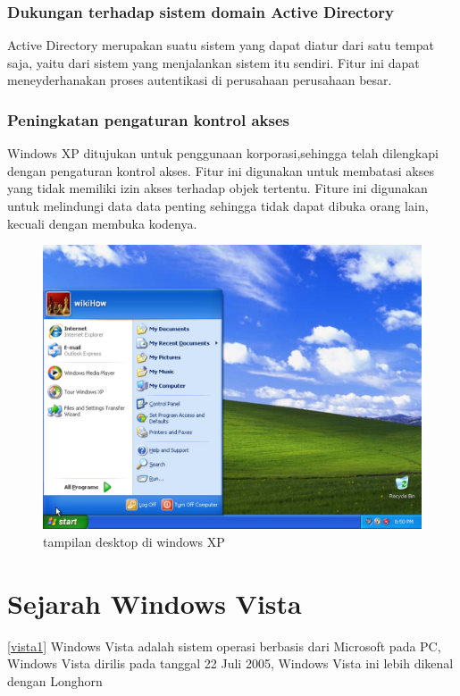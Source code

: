			\subsubsection{Dukungan terhadap sistem domain Active Directory} 
				Active Directory merupakan suatu sistem yang dapat diatur dari satu tempat saja, yaitu dari sistem yang menjalankan sistem itu sendiri. Fitur ini dapat meneyderhanakan 	proses autentikasi di perusahaan perusahaan besar.
			\subsubsection{Peningkatan pengaturan kontrol akses}
				Windows XP ditujukan untuk penggunaan korporasi,sehingga telah dilengkapi dengan pengaturan kontrol akses. Fitur ini digunakan untuk membatasi akses yang tidak memiliki izin akses terhadap objek tertentu.
				Fiture ini digunakan untuk melindungi data data penting sehingga tidak dapat dibuka orang lain, kecuali dengan membuka kodenya.

\begin{figure}[ht]
\centerline{\includegraphics[width=1\textwidth]{figures/windowsxp.JPG}}
\caption{tampilan desktop di windows XP}
\label{windowsxp}
\end{figure}
	\section{Sejarah Windows Vista}
\ref{vista1}
		Windows Vista adalah sistem operasi berbasis dari Microsoft pada PC, Windows Vista dirilis pada tanggal 22 Juli 2005, Windows Vista ini lebih dikenal dengan Longhorn
